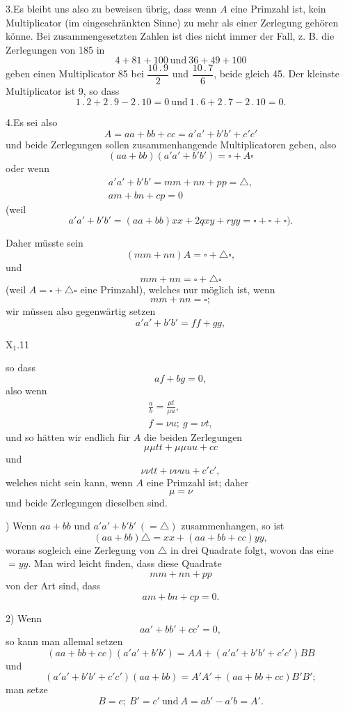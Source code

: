 3.\quad Es bleibt uns also zu beweisen übrig, dass wenn $A$ eine Primzahl
ist, kein Multiplicator (im eingeschränkten Sinne) zu mehr als einer Zerlegung
gehören könne. Bei zusammengesetzten Zahlen ist dies nicht immer der Fall,
z. B. die Zerlegungen von 185 in
\[
4+81+100\ \text{und}\ 36+49+100
\]
\noindent geben einen Multiplicator 85 bei $\dfrac{10\mathpunct{.}9}{2}$ und $\dfrac{10\mathpunct{.}7}{6}$, beide gleich 45. Der kleinste
Multiplicator ist 9, so dass
\[
1\mathpunct{.}2+2\mathpunct{.}9-2\mathpunct{.}10=0\ \text{und}\ 1\mathpunct{.}6+2\mathpunct{.}7-2\mathpunct{.}10=0.
\]
\par\noindent\hspace*{\parindent}4.\quad Es sei also
\[
A=aa+bb+cc=a'a'+b'b'+c'c'
\]
\noindent und beide Zerlegungen sollen zusammenhangende Multiplicatoren geben, also
\[
(aa+bb)(a'a'+b'b')=\square+A\square
\]
\noindent oder wenn
\[
\begin{gathered}
a'a'+b'b'=mm+nn+pp=\triangle,\\
am+bn+cp=0
\end{gathered}
\]
\noindent (weil
\[
a'a'+b'b'=(aa+bb)xx+2qxy+ryy=\square+\square+\square).
\]
\par\noindent\hspace*{\parindent}Daher müsste sein
\[
(mm+nn)A=\square+\triangle\square,
\]
\noindent und
\[
mm+nn=\square+\triangle\square
\]
\noindent (weil $A=\square+\triangle\square$ eine Primzahl), welches nur möglich ist, wenn
\[
mm+nn=\square;
\]
\noindent wir müssen also gegenwärtig setzen
\[
a'a'+b'b'=ff+gg,
\]
\par\vfill\noindent X$_1$.\hfill11\par\clearpage
{}
\noindent so dass
\[
af+bg=0,
\]
\noindent also wenn
\[
\begin{gathered}
\frac ab=\frac{\mu t}{\mu u},\\
f=\nu u;\ g=\nu t,
\end{gathered}
\]
\noindent und so hätten wir endlich für $A$ die beiden Zerlegungen
\[
\mu\mu tt+\mu\mu uu+cc
\]
\noindent und
\[
\nu\nu tt+\nu\nu uu+c'c',
\]
\noindent welches nicht sein kann, wenn $A$ eine Primzahl ist; daher
\[
\mu=\nu
\]
\noindent und beide Zerlegungen dieselben sind.
\begin{center}\end{center}
\par{}) Wenn $aa+bb$ und $a'a'+b'b'\ (=\triangle)$ zusammenhangen, so ist
\[
(aa+bb)\triangle=xx+(aa+bb+cc)yy,
\]
\noindent woraus sogleich eine Zerlegung von $\triangle$ in drei Quadrate folgt, wovon das
eine $=yy$. Man wird leicht finden, dass diese Quadrate
\[
mm+nn+pp
\]
\noindent von der Art sind, dass
\[
am+bn+cp=0.
\]
\par\noindent\hspace*{\parindent}2) Wenn
\[
aa'+bb'+cc'=0,
\]
\noindent so kann man allemal setzen
\[
(aa+bb+cc)(a'a'+b'b')=AA+(a'a'+b'b'+c'c')BB
\]
\noindent und
\[
(a'a'+b'b'+c'c')(aa+bb)=A'A'+(aa+bb+cc)B'B';
\]
\noindent man setze
\[
B=c;\ B'=c'\ \text{und}\ A=ab'-a'b=A'.
\]
\ClosingRule\clearpage
